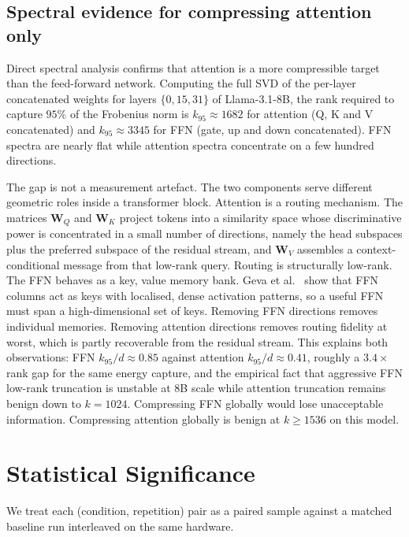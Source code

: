 \documentclass[11pt]{article}
\providecommand{\Wmat}{\mathbf{W}}
\begin{document}
\subsection{Spectral evidence for compressing attention only}
\label{sec:spectra}
Direct spectral analysis confirms that attention is a more compressible
target than the feed-forward network. Computing the full SVD of the
per-layer concatenated weights for layers $\{0,15,31\}$ of Llama-3.1-8B,
the rank required to capture $95\%$ of the Frobenius norm is
$k_{95}\approx1682$ for attention (Q, K and V concatenated) and
$k_{95}\approx3345$ for FFN (gate, up and down concatenated). FFN spectra
are nearly flat \cite{geva2021ffn} while attention spectra concentrate on
a few hundred directions.

The gap is not a measurement artefact. The two components serve different
geometric roles inside a transformer block. Attention is a routing
mechanism. The matrices $\Wmat_Q$ and $\Wmat_K$ project tokens into a
similarity space whose discriminative power is concentrated in a small
number of directions, namely the head subspaces plus the preferred
subspace of the residual stream, and $\Wmat_V$ assembles a
context-conditional message from that low-rank query. Routing is
structurally low-rank. The FFN behaves as a key, value memory bank.
Geva et al.\ \cite{geva2021ffn} show that FFN columns act as keys with
localised, dense activation patterns, so a useful FFN must span a
high-dimensional set of keys. Removing FFN directions removes individual
memories. Removing attention directions removes routing fidelity at
worst, which is partly recoverable from the residual stream. This
explains both observations: FFN $k_{95}/d\approx0.85$ against attention
$k_{95}/d\approx0.41$, roughly a $3.4\times$ rank gap for the same
energy capture, and the empirical fact that aggressive FFN low-rank
truncation is unstable at 8B scale while attention truncation remains
benign down to $k{=}1024$. Compressing FFN globally would lose
unacceptable information. Compressing attention globally is benign at
$k\geq1536$ on this model.
\FloatBarrier

\section{Statistical Significance}
\label{sec:stats}
We treat each (condition, repetition) pair as a paired sample against a
matched baseline run interleaved on the same hardware.
\end{document}
